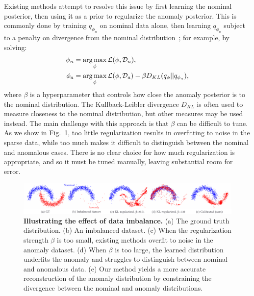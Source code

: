 Existing methods attempt to resolve this issue by first learning the nominal posterior, then using it as a prior to regularize the anomaly posterior. This is commonly done by training $q_{\phi_n}$ on nominal data alone, then learning $q_{\phi_a}$ subject to a penalty on divergence from the nominal distribution~\cite{asimInvertibleGenerativeModels2020,higginsBetaVAELearningBasic2016}; for example, by solving:
%
\begin{align}
    \phi_{n} & = \operatorname*{arg\,max}_\phi \mathcal{L}(\phi, \mathcal{D}_n),                                                                                 \\
    \phi_{a} & = \operatorname*{arg\,max}_\phi \mathcal{L}(\phi, \mathcal{D}_a) - \beta D_{KL}(q_{\phi} || q_{\phi_{n}}), \label{ch:icml:eq:elbo_kl_regularized}
\end{align}
where $\beta$ is a hyperparameter that controls how close the anomaly posterior is to the nominal distribution. The Kullback-Leibler divergence $D_{KL}$ is often used to measure closeness to the nominal distribution, but other measures may be used instead. The main challenge with this approach is that $\beta$ can be difficult to tune. As we show in Fig.~\ref{ch:icml:fig:toy_example}, too little regularization results in overfitting to noise in the sparse data, while too much makes it difficult to distinguish between the nominal and anomalous cases. There is no clear choice for how much regularization is appropriate, and so it must be tuned manually, leaving substantial room for error.

\begin{figure}[ht]
    \centering
    \includegraphics[width=\textwidth]{images/icml/toy_results_overview.pdf}
    \caption{\textbf{Illustrating the effect of data imbalance.} (a) The ground truth distribution. (b) An imbalanced dataset. (c) When the regularization strength $\beta$ is too small, existing methods overfit to noise in the anomaly dataset. (d) When $\beta$ is too large, the learned distribution underfits the anomaly and struggles to distinguish between nominal and anomalous data. (e) Our method yields a more accurate reconstruction of the anomaly distribution by constraining the divergence between the nominal and anomaly distributions.}
    \label{ch:icml:fig:toy_example}
\end{figure}


